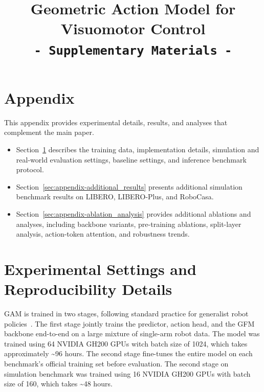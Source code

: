 \documentclass{llmxive}
\providecommand{\thesection}{\Alph{section}}
\providecommand{\maketitlesupp}{}
\begin{document}




\title{Geometric Action Model for Visuomotor Control\\\texttt{- Supplementary Materials -}}


\appendix

\setcounter{section}{0}
\renewcommand{\thesection}{\Alph{section}}

% 

\section*{\Large Appendix}
This appendix provides experimental details, results, and analyses that complement the main paper. 
\begin{itemize}
\item Section~\ref{sec:appendix-experimental_settings} describes the training data, implementation details, simulation and real-world evaluation settings, baseline settings, and inference benchmark protocol.
\item Section~\ref{sec:appendix-additional_results} presents additional simulation benchmark results on LIBERO, LIBERO-Plus, and RoboCasa.
\item Section~\ref{sec:appendix-ablation_analysis} provides additional ablations and analyses, including backbone variants, pre-training ablations, split-layer analysis, action-token attention, and robustness trends.
\end{itemize}

\label{secA}

\section{Experimental Settings and Reproducibility Details}
\label{sec:appendix-experimental_settings}

GAM is trained in two stages, following standard practice for generalist robot policies~\citep{openvla_oft, black2024pi_0}. The first stage jointly trains the predictor, action head, and the GFM backbone end-to-end on a large mixture of single-arm robot data. The model was trained using 64 NVIDIA GH200 GPUs witch batch size of 1024, which takes approximately \textasciitilde 96 hours. The second stage fine-tunes the entire model on each benchmark's official training set before evaluation. The second stage on simulation benchmark was trained using 16 NVIDIA GH200 GPUs with batch size of 160, which takes \textasciitilde 48 hours.
\end{document}
